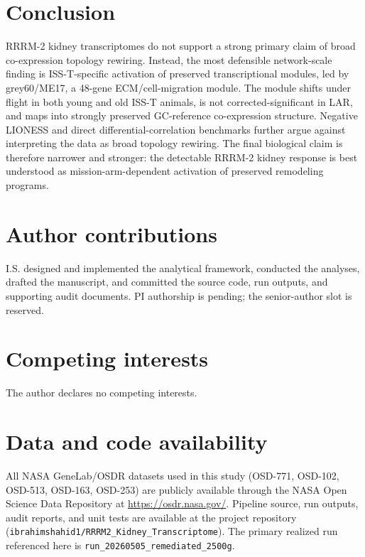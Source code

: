 \documentclass[11pt]{article}
\newcommand{\code}[1]{\texttt{#1}}
\newcommand{\runid}{\code{run\_20260505\_remediated\_2500g}}
\begin{document}
\section{Conclusion}

RRRM-2 kidney transcriptomes do not support a strong primary claim of broad co-expression topology rewiring. Instead, the most defensible network-scale finding is ISS-T-specific activation of preserved transcriptional modules, led by grey60/ME17, a 48-gene ECM/cell-migration module. The module shifts under flight in both young and old ISS-T animals, is not corrected-significant in LAR, and maps into strongly preserved GC-reference co-expression structure. Negative LIONESS and direct differential-correlation benchmarks further argue against interpreting the data as broad topology rewiring. The final biological claim is therefore narrower and stronger: the detectable RRRM-2 kidney response is best understood as mission-arm-dependent activation of preserved remodeling programs.

\section*{Author contributions}

I.S. designed and implemented the analytical framework, conducted the analyses, drafted the manuscript, and committed the source code, run outputs, and supporting audit documents. PI authorship is pending; the senior-author slot is reserved.

\section*{Competing interests}
The author declares no competing interests.

\section*{Data and code availability}
All NASA GeneLab/OSDR datasets used in this study (OSD-771, OSD-102, OSD-513, OSD-163, OSD-253) are publicly available through the NASA Open Science Data Repository at \url{https://osdr.nasa.gov/}. Pipeline source, run outputs, audit reports, and unit tests are available at the project repository (\code{ibrahimshahid1/RRRM2\_Kidney\_Transcriptome}). The primary realized run referenced here is \runid.
\end{document}
